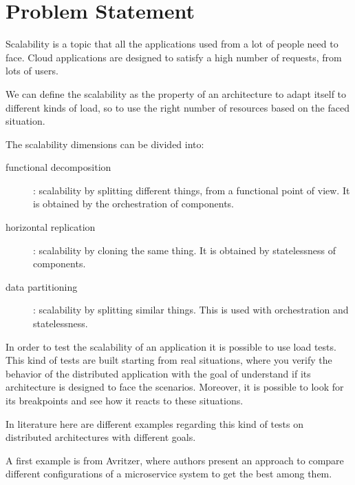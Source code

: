 \chapter{Problem Statement\label{sec:problemstatement}}

Scalability is a topic that all the applications used from a lot of people need to face.
Cloud applications are designed to satisfy a high number of requests, from lots of users.

We can define the scalability as the property of an architecture to adapt itself to different kinds of load, so to use the right number of resources based on the faced situation.

The scalability dimensions \cite{eventuate_2021} can be divided into:
\begin{description}
    \item[functional decomposition]: scalability by splitting different things, from a functional point of view. It is obtained by the orchestration of components.
    \item[horizontal replication]: scalability by cloning the same thing. It is obtained by statelessness of components.
    \item[data partitioning]: scalability by splitting similar things. This is used with orchestration and statelessness. 
\end{description}

In order to test the scalability of an application it is possible to use load tests.
This kind of tests are built starting from real situations, where you verify the behavior of the distributed application with the goal of understand if its architecture is designed to face the scenarios.
Moreover, it is possible to look for its breakpoints and see how it reacts to these situations.

In literature here are different examples regarding this kind of tests on distributed architectures with different goals.

A first example is from Avritzer\cite{avritzer2020scalability}, where authors present an approach to compare different configurations of a microservice system to get the best among them.

